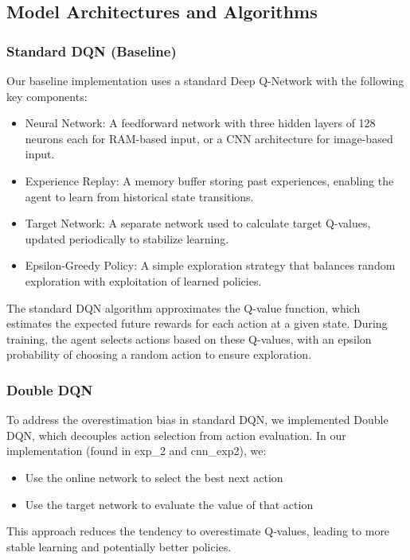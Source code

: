 \documentclass{article} %
\begin{document}
\subsection{Model Architectures and Algorithms}

\subsubsection{Standard DQN (Baseline)}

Our baseline implementation uses a standard Deep Q-Network with the following key components:
\begin{itemize}
  \item Neural Network: A feedforward network with three hidden layers of 128 neurons each for RAM-based input, or a CNN architecture for image-based input.
  \item Experience Replay: A memory buffer storing past experiences, enabling the agent to learn from historical state transitions.
  \item Target Network: A separate network used to calculate target Q-values, updated periodically to stabilize learning.
  \item Epsilon-Greedy Policy: A simple exploration strategy that balances random exploration with exploitation of learned policies.
\end{itemize}

The standard DQN algorithm approximates the Q-value function, which estimates the expected future rewards for each action at a given state. During training, the agent selects actions based on these Q-values, with an epsilon probability of choosing a random action to ensure exploration.

\subsubsection{Double DQN}

To address the overestimation bias in standard DQN, we implemented Double DQN, which decouples action selection from action evaluation. In our implementation (found in exp\_2 and cnn\_exp2), we:
\begin{itemize}
  \item Use the online network to select the best next action
  \item Use the target network to evaluate the value of that action
\end{itemize}

This approach reduces the tendency to overestimate Q-values, leading to more stable learning and potentially better policies.
\end{document}
